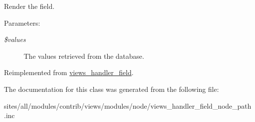 Render the field.

\begin{Desc}
\item[Parameters:]
\begin{description}
\item[{\em \$values}]The values retrieved from the database. \end{description}
\end{Desc}


Reimplemented from \hyperlink{classviews__handler__field_82ff951c5e9ceb97b2eab86f880cbc1e}{views\_\-handler\_\-field}.

The documentation for this class was generated from the following file:\begin{CompactItemize}
\item 
sites/all/modules/contrib/views/modules/node/views\_\-handler\_\-field\_\-node\_\-path.inc\end{CompactItemize}
